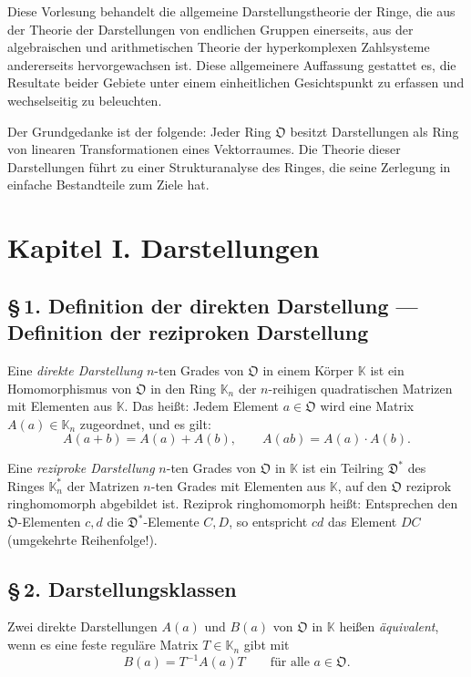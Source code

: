 \documentclass[10pt,a4paper]{article}
\theoremstyle{plain}
\theoremstyle{definition}
\theoremstyle{remark}
\newcommand{\KK}{\mathbb{K}}
\newcommand{\cO}{\mathfrak{O}}
\newcommand{\cD}{\mathfrak{D}}
\begin{document}
Diese Vorlesung behandelt die allgemeine Darstellungstheorie der Ringe, die aus der Theorie der Darstellungen von endlichen Gruppen einerseits, aus der algebraischen und arithmetischen Theorie der hyperkomplexen Zahlsysteme andererseits hervorgewachsen ist. Diese allgemeinere Auffassung gestattet es, die Resultate beider Gebiete unter einem einheitlichen Gesichtspunkt zu erfassen und wechselseitig zu beleuchten.

Der Grundgedanke ist der folgende: Jeder Ring $\cO$ besitzt Darstellungen als Ring von linearen Transformationen eines Vektorraumes. Die Theorie dieser Darstellungen f\"uhrt zu einer Strukturanalyse des Ringes, die seine Zerlegung in einfache Bestandteile zum Ziele hat.

\newpage
\section*{Kapitel I. Darstellungen}

\subsection*{\S\,1. Definition der direkten Darstellung --- Definition der reziproken Darstellung}

Eine \emph{direkte Darstellung} $n$-ten Grades von $\cO$ in einem K\"orper $\KK$ ist ein Homomorphismus von $\cO$ in den Ring $\KK_n$ der $n$-reihigen quadratischen Matrizen mit Elementen aus $\KK$. Das hei\ss t: Jedem Element $a \in \cO$ wird eine Matrix $A(a) \in \KK_n$ zugeordnet, und es gilt:
\[
A(a+b) = A(a) + A(b), \qquad A(ab) = A(a) \cdot A(b).
\]

Eine \emph{reziproke Darstellung} $n$-ten Grades von $\cO$ in $\KK$ ist ein Teilring $\cD^*$ des Ringes $\KK_n^*$ der Matrizen $n$-ten Grades mit Elementen aus $\KK$, auf den $\cO$ reziprok ringhomomorph abgebildet ist. Reziprok ringhomomorph hei\ss t: Entsprechen den $\cO$-Elementen $c, d$ die $\cD^*$-Elemente $C, D$, so entspricht $cd$ das Element $DC$ (umgekehrte Reihenfolge!).

\subsection*{\S\,2. Darstellungsklassen}

Zwei direkte Darstellungen $A(a)$ und $B(a)$ von $\cO$ in $\KK$ hei\ss en \emph{\"aquivalent}, wenn es eine feste regul\"are Matrix $T \in \KK_n$ gibt mit
\[
B(a) = T^{-1} A(a) T \qquad \text{f\"ur alle } a \in \cO.
\]
\end{document}

